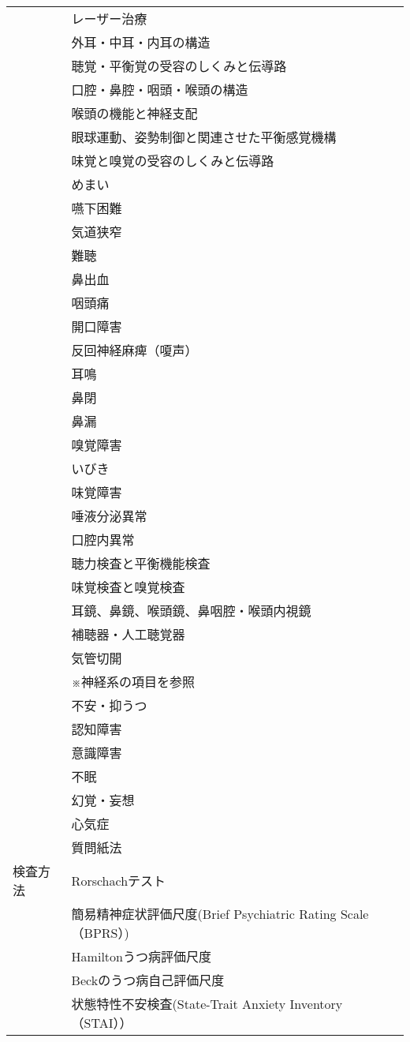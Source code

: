 \begin{xltabular}{\linewidth}{XX}
 & レーザー治療 \\
 & 外耳・中耳・内耳の構造 \\
 & 聴覚・平衡覚の受容のしくみと伝導路 \\
 & 口腔・鼻腔・咽頭・喉頭の構造 \\
 & 喉頭の機能と神経支配 \\
 & 眼球運動、姿勢制御と関連させた平衡感覚機構 \\
 & 味覚と嗅覚の受容のしくみと伝導路 \\
 & めまい \\
 & 嚥下困難 \\
 & 気道狭窄 \\
 & 難聴 \\
 & 鼻出血 \\
 & 咽頭痛 \\
 & 開口障害 \\
 & 反回神経麻痺（嗄声） \\
 & 耳鳴 \\
 & 鼻閉 \\
 & 鼻漏 \\
 & 嗅覚障害 \\
 & いびき \\
 & 味覚障害 \\
 & 唾液分泌異常 \\
 & 口腔内異常 \\
 & 聴力検査と平衡機能検査 \\
 & 味覚検査と嗅覚検査 \\
 & 耳鏡、鼻鏡、喉頭鏡、鼻咽腔・喉頭内視鏡 \\
 & 補聴器・人工聴覚器 \\
 & 気管切開 \\
 & ※神経系の項目を参照 \\
 & 不安・抑うつ \\
 & 認知障害 \\
 & 意識障害 \\
 & 不眠 \\
 & 幻覚・妄想 \\
 & 心気症 \\
 & 質問紙法 \\
検査方法 & Rorschachテスト \\
 & 簡易精神症状評価尺度(Brief Psychiatric Rating Scale （BPRS）) \\
 & Hamiltonうつ病評価尺度 \\
 & Beckのうつ病自己評価尺度 \\
 & 状態特性不安検査(State-Trait Anxiety Inventory　 （STAI）） \\

\end{xltabular}
